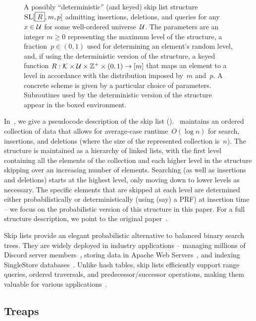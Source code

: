 \begin{figure*}[thp]
\begin{pchstack}[boxed,center,space=0.5em]
    \end{pchstack}
    \caption[Skip List Structure.]{A possibly ``deterministic'' (and keyed) skip list structure $\textnormal{\textsc{SL}}[\boxed{R},m,p]$ admitting insertions, deletions, and queries for any~$x \in \mathcal{U}$ for some well-ordered universe~$\mathcal{U}$. The parameters are an integer $m \geq 0$ representing the maximum level of the structure, a fraction~$p \in (0,1)$ used for determining an element's random level, and, if using the deterministic version of the structure, a keyed function $R: \mathcal{K} \times \mathcal{U} \times \mathbb{Z}^{+} \times (0,1) \to [m]$ that maps an element to a level in accordance with the distribution imposed by~$m$ and~$p$. A concrete scheme is given by a particular choice of parameters. Subroutines used by the deterministic version of the structure appear in the boxed environment. 
    } 
    \label{fig:sl}
\end{figure*}

In~, we give a pseudocode description of the skip list (\SL). \SL \ maintains an ordered collection of data that allows for average-case runtime~$O(\log n)$ for search, insertions, and deletions (where the size of the represented collection is~$n$). The structure is maintained as a hierarchy of linked lists, with the first level containing all the elements of the collection and each higher level in the structure skipping over an increasing number of elements. Searching (as well as insertions and deletions) starts at the highest level, only moving down to lower levels as necessary. The specific elements that are skipped at each level are determined either probabilistically or deterministically (using (say) a PRF) at insertion time -- we focus on the probabilistic version of this structure in this paper. For a full structure description, we point to the original paper~\cite{pugh}. 

Skip lists provide an elegant probabilistic alternative to balanced binary search trees. They are widely deployed in industry applications -- managing millions of Discord server members~\cite{discord}, storing data in Apache Web Servers~\cite{apache}, and indexing SingleStore databases~\cite{singlestore}. Unlike hash tables, skip lists efficiently support range queries, ordered traversals, and predecessor/successor operations, making them valuable for various applications~\cite{quantumwalk, skabnet, InPlaceKV}.

\subsection{Treaps}
\label{prelim:tr}

